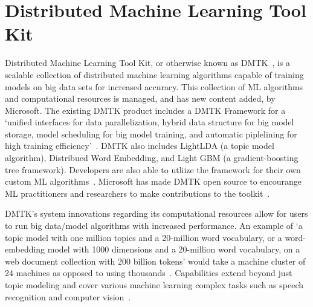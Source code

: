\section{Distributed Machine Learning Tool Kit}

Distributed Machine Learning Tool Kit, or otherwise known as DMTK~\cite{hid-sp18-504-dmtk},
is a scalable collection of distributed machine learning algorithms
capable of training models on big data sets for increased accuracy.
This collection of ML algorithms and computational resources is managed,
and has new content added, by Microsoft. The existing DMTK product includes
a DMTK Framework for a `unified interfaces for data parallelization,
hybrid data structure for big model storage, model scheduling for big model
training, and automatic piplelining for high training efficiency'~\cite{hid-sp18-504-dmtk}.
DMTK also includes LightLDA (a topic model algorithm), Distribued
Word Embedding, and Light GBM (a gradient-boosting tree framework).
Developers are also able to utliize the framework for their own custom
ML algorithms~\cite{hid-sp18-504-dmtk}. Microsoft has made DMTK open
source to encourange  ML practitioners and researchers to make contributions
to the toolkit~\cite{hid-sp18-504-msresearch}.

DMTK's system innovations regarding its computational resources
allow for users to run big data/model algorithms with increased
performance. An example of `a topic model with one million topics
and a 20-million word vocabulary, or a word-embedding model with
1000 dimensions and a 20-million word vocabulary, on a web document
collection with 200 billion tokens' would take a machine cluster of
24 machines as opposed to using thousands~\cite{hid-sp18-504-msresearch}.
Capabilities extend beyond just topic modeling and cover various
machine learning complex tasks such as speech recognition and
computer vision~\cite{hid-sp18-504-msresearch}.
